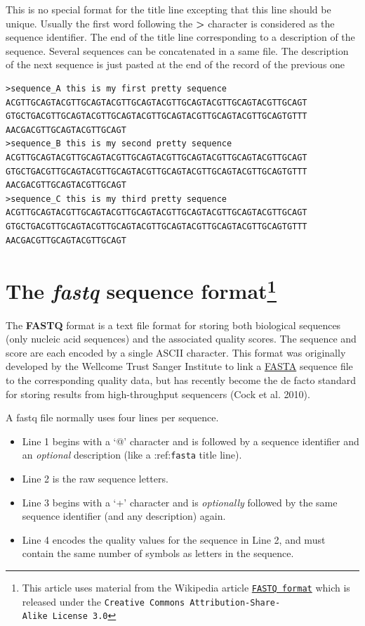 \documentclass[
  letterpaper,
  DIV=11,
  numbers=noendperiod]{scrreprt}
\providecommand{\tightlist}{%
  \setlength{\itemsep}{0pt}\setlength{\parskip}{0pt}}\usepackage{longtable,booktabs,array}
\begin{document}
This is no special format for the title line excepting that this line
should be unique. Usually the first word following the
\textbf{\textgreater{}} character is considered as the sequence
identifier. The end of the title line corresponding to a description of
the sequence. Several sequences can be concatenated in a same file. The
description of the next sequence is just pasted at the end of the record
of the previous one

\begin{verbatim}
>sequence_A this is my first pretty sequence
ACGTTGCAGTACGTTGCAGTACGTTGCAGTACGTTGCAGTACGTTGCAGTACGTTGCAGT
GTGCTGACGTTGCAGTACGTTGCAGTACGTTGCAGTACGTTGCAGTACGTTGCAGTGTTT
AACGACGTTGCAGTACGTTGCAGT
>sequence_B this is my second pretty sequence
ACGTTGCAGTACGTTGCAGTACGTTGCAGTACGTTGCAGTACGTTGCAGTACGTTGCAGT
GTGCTGACGTTGCAGTACGTTGCAGTACGTTGCAGTACGTTGCAGTACGTTGCAGTGTTT
AACGACGTTGCAGTACGTTGCAGT
>sequence_C this is my third pretty sequence
ACGTTGCAGTACGTTGCAGTACGTTGCAGTACGTTGCAGTACGTTGCAGTACGTTGCAGT
GTGCTGACGTTGCAGTACGTTGCAGTACGTTGCAGTACGTTGCAGTACGTTGCAGTGTTT
AACGACGTTGCAGTACGTTGCAGT
\end{verbatim}

\hypertarget{sec-fastq}{%
\section[The \emph{fastq} sequence format]{\texorpdfstring{The
\emph{fastq} sequence
format\footnote{This article uses material from the Wikipedia article
  \href{http://en.wikipedia.org/wiki/FASTQ_format}{\texttt{FASTQ\ format}}
  which is released under the
  \texttt{Creative\ Commons\ Attribution-Share-Alike\ License\ 3.0}}}{The fastq sequence format}}\label{sec-fastq}}

The \textbf{FASTQ} format is a text file format for storing both
biological sequences (only nucleic acid sequences) and the associated
quality scores. The sequence and score are each encoded by a single
ASCII character. This format was originally developed by the Wellcome
Trust Sanger Institute to link a
\protect\hyperlink{the-fasta-sequence-format}{FASTA} sequence file to
the corresponding quality data, but has recently become the de facto
standard for storing results from high-throughput sequencers (Cock et
al. 2010).

A fastq file normally uses four lines per sequence.

\begin{itemize}
\tightlist
\item
  Line 1 begins with a `@' character and is followed by a sequence
  identifier and an \emph{optional} description (like a
  :ref:\texttt{fasta} title line).
\item
  Line 2 is the raw sequence letters.
\item
  Line 3 begins with a `+' character and is \emph{optionally} followed
  by the same sequence identifier (and any description) again.
\item
  Line 4 encodes the quality values for the sequence in Line 2, and must
  contain the same number of symbols as letters in the sequence.
\end{itemize}
\end{document}
